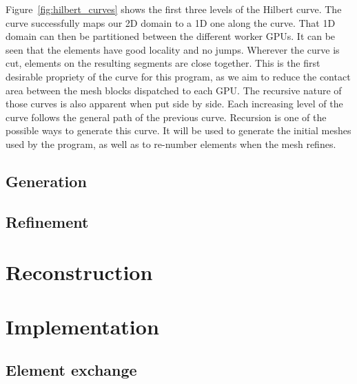 Figure~\ref{fig:hilbert_curves} shows the first three levels of the Hilbert curve. The curve
successfully maps our 2D domain to a 1D one along the curve. That 1D domain can then be partitioned
between the different worker GPUs. It can be seen that the elements have good locality and no jumps. 
Wherever the curve is cut, elements on the resulting segments are close together. This is the first 
desirable propriety of the curve for this program, as we aim to reduce the contact area between 
the mesh blocks dispatched to each GPU. The recursive nature of those curves is also apparent when
put side by side. Each increasing level of the curve follows the general path of the previous curve.
Recursion is one of the possible ways to generate this curve. It will be used to generate the
initial meshes used by the program, as well as to re-number elements when the mesh refines.

\subsection{Generation} \label{section:load_balancing:hilbert_curve:generation}

\subsection{Refinement} \label{section:load_balancing:hilbert_curve:refinement}


\section{Reconstruction} \label{section:load_balancing:reconstruction}

\section{Implementation} \label{section:load_balancing:implementation}
\subsection{Element exchange} \label{section:load_balancing:implementation:element_exchange}
